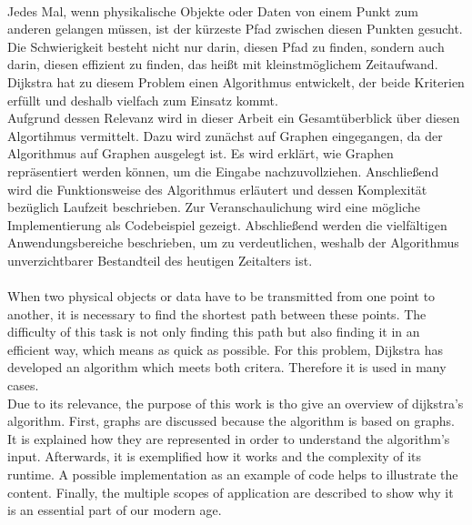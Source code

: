 \kurzfassung

\paragraph*{}

Jedes Mal, wenn physikalische Objekte oder Daten von einem Punkt zum anderen gelangen müssen, ist der kürzeste Pfad zwischen diesen Punkten gesucht. Die Schwierigkeit besteht nicht nur darin, diesen Pfad zu finden, sondern auch darin, diesen effizient zu finden, das heißt mit kleinstmöglichem Zeitaufwand. 
Dijkstra hat zu diesem Problem einen Algorithmus entwickelt, der beide Kriterien erfüllt und deshalb vielfach zum Einsatz kommt. \\
Aufgrund dessen Relevanz wird in dieser Arbeit ein Gesamtüberblick über diesen Algortihmus vermittelt.
Dazu wird zunächst auf Graphen eingegangen, da der Algorithmus auf Graphen ausgelegt ist. Es wird erklärt, wie Graphen repräsentiert werden können, um die Eingabe nachzuvollziehen.
Anschließend wird die Funktionsweise des Algorithmus erläutert und dessen Komplexität bezüglich Laufzeit  beschrieben. Zur Veranschaulichung wird eine mögliche Implementierung als Codebeispiel gezeigt.
Abschließend werden die vielfältigen Anwendungsbereiche beschrieben, um zu verdeutlichen, weshalb der Algorithmus unverzichtbarer Bestandteil des heutigen Zeitalters ist. 
\\
\\
When two physical objects or data have to be transmitted from one point to another, it is necessary to find the shortest path between these points. The difficulty of this task is not only finding this path but also finding it in an efficient way, which means as quick as possible.
For this problem, Dijkstra has developed an algorithm which meets both critera. Therefore it is used in many cases. \\
Due to its relevance, the purpose of this work is tho give an overview of dijkstra's algorithm.
First, graphs are discussed because the algorithm is based on graphs. It is explained how they are represented in order to understand the algorithm's input. 
Afterwards, it is exemplified how it works and the complexity of its runtime.
A possible implementation as an example of code helps to illustrate the content.
Finally, the multiple scopes of application are described to show why it is an essential part of our modern age.
